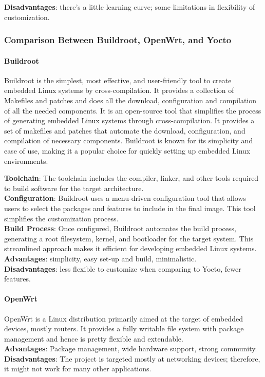 \textbf{Disadvantages}: there's a little learning curve; some limitations in flexibility of customization.\\

\subsubsection{Comparison Between Buildroot, OpenWrt, and Yocto} 

\paragraph{\textbf{Buildroot\\} }
Buildroot is the simplest, most effective, and user-friendly tool to create embedded Linux systems by cross-compilation. It provides a collection of Makefiles and patches and does all the download, configuration and compilation of all the needed components.
It is an open-source tool that simplifies the process of generating embedded Linux systems through cross-compilation. It provides a set of makefiles and patches that automate the download, configuration, and compilation of necessary components. Buildroot is known for its simplicity and ease of use, making it a popular choice for quickly setting up embedded Linux environments.

\textbf{Toolchain}: The toolchain includes the compiler, linker, and other tools required to build software for the target architecture.\\

\textbf{Configuration}: Buildroot uses a menu-driven configuration tool that allows users to select the packages and features to include in the final image. This tool simplifies the customization process.
\\
\textbf{Build Process}: Once configured, Buildroot automates the build process, generating a root filesystem, kernel, and bootloader for the target system. This streamlined approach makes it efficient for developing embedded Linux systems.\\

\noindent
\textbf{Advantages}: simplicity, easy set-up and build, minimalistic.\\
\textbf{Disadvantages}: less flexible to customize when comparing to Yocto, fewer features.\\

\paragraph{\textbf{OpenWrt\\}} 
OpenWrt is a Linux distribution primarily aimed at the target of embedded devices, mostly routers. It provides a fully writable file system with package management and hence is pretty flexible and extendable.
\\
\noindent
\textbf{Advantages}: Package management, wide hardware support, strong community.\\
\textbf{Disadvantages}: The project is targeted mostly at networking devices; therefore, it might not work for many other applications.\\

